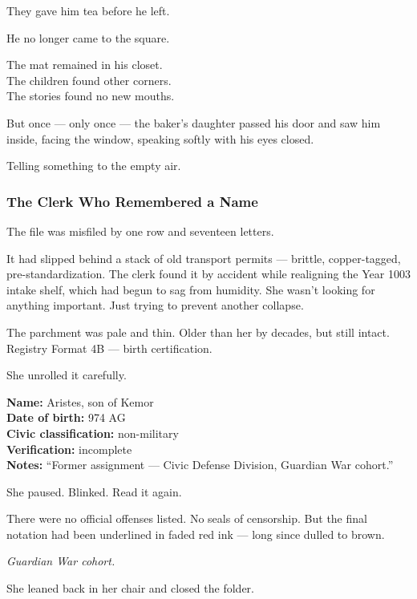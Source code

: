 \documentclass[12pt]{article}
\begin{document}
They gave him tea before he left.

\vspace{1em}

He no longer came to the square.

The mat remained in his closet.\\
The children found other corners.\\
The stories found no new mouths.

But once --- only once --- the baker’s daughter passed his door and saw him inside, facing the window, speaking softly with his eyes closed.

Telling something to the empty air.

\dotfill

\subsubsection*{The Clerk Who Remembered a Name}

The file was misfiled by one row and seventeen letters.

It had slipped behind a stack of old transport permits --- brittle, copper-tagged, pre-standardization. The clerk found it by accident while realigning the Year 1003 intake shelf, which had begun to sag from humidity. She wasn’t looking for anything important. Just trying to prevent another collapse.

The parchment was pale and thin. Older than her by decades, but still intact. Registry Format 4B --- birth certification.

She unrolled it carefully.

\textbf{Name:} Aristes, son of Kemor\\
\textbf{Date of birth:} 974 AG\\
\textbf{Civic classification:} non-military\\
\textbf{Verification:} incomplete\\
\textbf{Notes:} “Former assignment --- Civic Defense Division, Guardian War cohort.”

She paused. Blinked. Read it again.

There were no official offenses listed. No seals of censorship. But the final notation had been underlined in faded red ink --- long since dulled to brown.

\textit{Guardian War cohort.}

\vspace{1em}

She leaned back in her chair and closed the folder.
\end{document}
